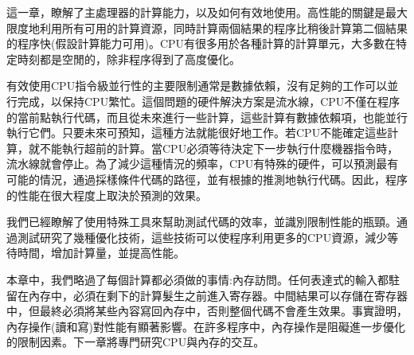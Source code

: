 這一章，瞭解了主處理器的計算能力，以及如何有效地使用。高性能的關鍵是最大限度地利用所有可用的計算資源，同時計算兩個結果的程序比稍後計算第二個結果的程序快(假設計算能力可用)。CPU有很多用於各種計算的計算單元，大多數在特定時刻都是空閒的，除非程序得到了高度優化。

有效使用CPU指令級並行性的主要限制通常是數據依賴，沒有足夠的工作可以並行完成，以保持CPU繁忙。這個問題的硬件解決方案是流水線，CPU不僅在程序的當前點執行代碼，而且從未來進行一些計算，這些計算有數據依賴項，也能並行執行它們。只要未來可預知，這種方法就能很好地工作。若CPU不能確定這些計算，就不能執行超前的計算。當CPU必須等待決定下一步執行什麼機器指令時，流水線就會停止。為了減少這種情況的頻率，CPU有特殊的硬件，可以預測最有可能的情況，通過採樣條件代碼的路徑，並有根據的推測地執行代碼。因此，程序的性能在很大程度上取決於預測的效果。

我們已經瞭解了使用特殊工具來幫助測試代碼的效率，並識別限制性能的瓶頸。通過測試研究了幾種優化技術，這些技術可以使程序利用更多的CPU資源，減少等待時間，增加計算量，並提高性能。

本章中，我們略過了每個計算都必須做的事情:內存訪問。任何表達式的輸入都駐留在內存中，必須在剩下的計算髮生之前進入寄存器。中間結果可以存儲在寄存器中，但最終必須將某些內容寫回內存中，否則整個代碼不會產生效果。事實證明，內存操作(讀和寫)對性能有顯著影響。在許多程序中，內存操作是阻礙進一步優化的限制因素。下一章將專門研究CPU與內存的交互。







